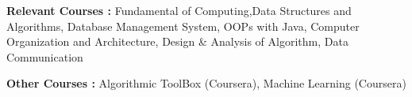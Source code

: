 \begin{cventries}
  \cventry
    {\large\textbf {Relevant Courses :}}
    {}
    {}
    {}
    {\small Fundamental of Computing,Data Structures and Algorithms, Database Management System, OOPs with Java, Computer Organization and Architecture, Design \& Analysis of Algorithm, Data Communication
    }
    
  \cventry
    {\large\textbf {Other Courses :}}
    {}
    {}
    {}
    {\small Algorithmic ToolBox (Coursera), Machine Learning (Coursera)
    }
\end{cventries}